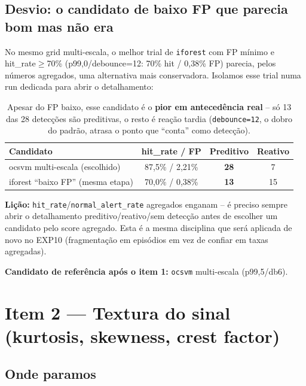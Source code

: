 \documentclass[11pt,a4paper]{article}
\begin{document}
\subsection{Desvio: o candidato de baixo FP que parecia bom mas não era}
\label{sec:licao}

No mesmo grid multi-escala, o melhor trial de \texttt{iforest} com FP
mínimo e hit\_rate$\geq$70\% (p99,0/debounce=12: 70\% hit / 0,38\% FP)
parecia, pelos números agregados, uma alternativa mais conservadora.
Isolamos esse trial numa run dedicada para abrir o detalhamento:

\begin{table}[H]
\centering
\begin{tabular}{@{}lccc@{}}
\toprule
\textbf{Candidato} & \textbf{hit\_rate / FP} & \textbf{Preditivo} & \textbf{Reativo} \\
\midrule
ocsvm multi-escala (escolhido) & 87,5\% / 2,21\% & \textbf{28} & 7 \\
iforest ``baixo FP'' (mesma etapa) & 70,0\% / 0,38\% & \textbf{13} & 15 \\
\bottomrule
\end{tabular}
\caption{Apesar do FP baixo, esse candidato é o \textbf{pior em
antecedência real} -- só 13 das 28 detecções são preditivas, o resto é
reação tardia (\texttt{debounce=12}, o dobro do padrão, atrasa o ponto que
``conta'' como detecção).}
\end{table}

\textbf{Lição:} \texttt{hit\_rate}/\texttt{normal\_alert\_rate} agregados
enganam -- é preciso sempre abrir o detalhamento preditivo/reativo/sem
detecção antes de escolher um candidato pelo score agregado. Esta é a
mesma disciplina que será aplicada de novo no EXP10 (fragmentação em
episódios em vez de confiar em taxas agregadas).

\textbf{Candidato de referência após o item 1:} \texttt{ocsvm} multi-escala
(p99,5/db6).

\section{Item 2 --- Textura do sinal (kurtosis, skewness, crest factor)}
\label{sec:item2}

\subsection{Onde paramos}
\end{document}
